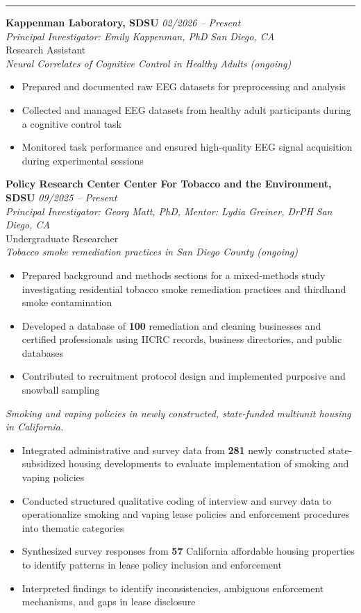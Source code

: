 \documentclass[11pt]{article}
\newcommand{\cvsection}[1]{%
  \par\vspace{7pt}%
  \noindent{\normalsize\bfseries\MakeUppercase{#1}}%
  \par\vspace{2pt}%
  \noindent\rule{\textwidth}{0.6pt}%
  \par\vspace{4pt}%
}
\newenvironment{cvlist}{%
  \begin{itemize}%
  \setlength{\leftmargin}{1.3em}%
  \setlength{\topsep}{2pt}%
  \setlength{\itemsep}{1.5pt}%
  \setlength{\parsep}{0pt}%
  \setlength{\partopsep}{0pt}%
}{\end{itemize}}
\begin{document}
\cvsection{Research Experience}
\textbf{Kappenman Laboratory, SDSU} \hfill \textit{02/2026 -- Present}\\
\textit{Principal Investigator: Emily Kappenman, PhD} \hfill \textit{San Diego, CA}\\[4pt]
Research Assistant\\
\textit{Neural Correlates of Cognitive Control in Healthy Adults (ongoing)}
\begin{cvlist}
  \item Prepared and documented raw EEG datasets for preprocessing and analysis
  \item Collected and managed EEG datasets from healthy adult participants during a cognitive control task
  \item Monitored task performance and ensured high-quality EEG signal acquisition during experimental sessions
\end{cvlist}

\vspace{4pt}
\textbf{Policy Research Center \textbar{} Center For Tobacco and the Environment, SDSU} \hfill \textit{09/2025 -- Present}\\
\textit{Principal Investigator: Georg Matt, PhD, Mentor: Lydia Greiner, DrPH} \hfill \textit{San Diego, CA}\\[4pt]
Undergraduate Researcher\\
\textit{Tobacco smoke remediation practices in San Diego County (ongoing)}
\begin{cvlist}
  \item Prepared background and methods sections for a mixed-methods study investigating residential tobacco smoke remediation practices and thirdhand smoke contamination
  \item Developed a database of \textbf{100} remediation and cleaning businesses and certified professionals using IICRC records, business directories, and public databases
  \item Contributed to recruitment protocol design and implemented purposive and snowball sampling
\end{cvlist}

\vspace{3pt}
\textit{Smoking and vaping policies in newly constructed, state-funded multiunit housing in California.}
\begin{cvlist}
  \item Integrated administrative and survey data from \textbf{281} newly constructed state-subsidized housing developments to evaluate implementation of smoking and vaping policies
  \item Conducted structured qualitative coding of interview and survey data to operationalize smoking and vaping lease policies and enforcement procedures into thematic categories
  \item Synthesized survey responses from \textbf{57} California affordable housing properties to identify patterns in lease policy inclusion and enforcement
  \item Interpreted findings to identify inconsistencies, ambiguous enforcement mechanisms, and gaps in lease disclosure
\end{cvlist}
\end{document}
